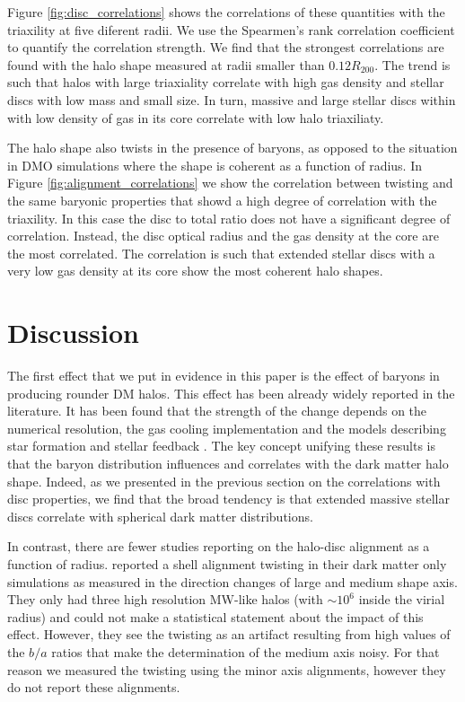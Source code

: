 \documentclass[usenatbib]{mnras}
\begin{document}
Figure \ref{fig:disc_correlations} shows the correlations of
these quantities with the triaxility at five diferent radii.
We use the Spearmen's rank correlation coefficient to quantify the
correlation strength.
We find that the strongest correlations are found with the halo shape
measured at radii smaller than $0.12R_{200}$.
The  trend is such that halos with large triaxiality correlate with
high gas density and stellar discs with low mass and small size. 
In turn, massive and large stellar discs within with low density of
gas in its core correlate with low halo triaxiliaty. 

The halo shape also twists in the presence of baryons, as opposed to
the situation in DMO simulations where the shape is coherent as a
function of radius.
In Figure \ref{fig:alignment_correlations} we show the correlation
between twisting and the same baryonic properties that showd a high
degree of correlation with the triaxility.
In this case the disc to total ratio does not have a significant
degree of correlation.
Instead, the disc optical radius and the gas density at the core are
the most correlated. 
The correlation is such that extended stellar discs with a very low
gas density at its core show the most coherent halo shapes.  

\section{Discussion}
\label{sec:discussion}


The first effect that we put in evidence in this paper is the effect
of baryons in producing rounder DM halos.
This effect has been already widely reported in the literature.
It has been found that the strength of the change depends on the
numerical resolution, the gas cooling implementation and the
models describing star formation and stellar feedback
\citep{Kazantzidis04,Bailin05,Debattista08, Bryan13, Butsky16, Chua19, Artale19}.  
The key concept unifying these results is that the baryon distribution
influences and correlates with the dark matter halo shape. 
Indeed, as we presented in the previous section on the correlations
with disc properties, we find that the broad tendency is that extended
massive stellar discs correlate with spherical dark matter
distributions.  

In contrast, there are fewer studies reporting on the halo-disc
alignment as a function of radius.
\cite{JingSuto02} reported a shell alignment twisting in their dark
matter only simulations as measured in the direction changes of large
and medium shape axis. 
They only had three high resolution MW-like halos (with
$\sim 10^{6}$ inside the virial radius) and could not make a
statistical statement about the impact of this effect.
However, they see the twisting as an artifact resulting from high values of the
$b/a$ ratios that make the determination of the medium axis noisy.
For that reason we measured the twisting using the minor axis
alignments, however they do not report these alignments.
\end{document}
